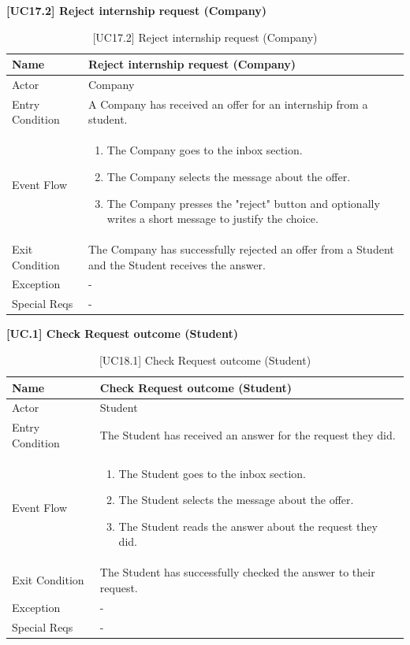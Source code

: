 \textbf{[UC17.2] Reject internship request (Company)}
\begin{table}[H] %
    \centering
    \begin{tabular}{|p{3cm}|p{10cm}|}
    \hline
    Name & Reject internship request (Company) \\ \hline
    Actor  & Company \\ \hline
    Entry Condition  & A Company has received an offer for an internship from a student.  \\ \hline
    Event Flow  & 
    \begin{enumerate}[noitemsep, topsep=0pt]
        \item The Company goes to the inbox section.
        \item The Company selects the message about the offer.
        \item The Company presses the "reject" button and optionally writes a short message to justify the choice.
    \end{enumerate}
    \\ \hline
    Exit Condition  & The Company has successfully rejected an offer from a Student and the Student receives the answer. \\ \hline
    Exception  & - \\ \hline
    Special Reqs  & - \\ \hline
    \end{tabular}
    \caption{[UC17.2] Reject internship request (Company)}
\end{table}
\textbf{[UC\nextUseCases.1] Check Request outcome (Student)}
\begin{table}[H] %
    \centering
    \begin{tabular}{|p{3cm}|p{10cm}|}
    \hline
    Name & Check Request outcome (Student)\\ \hline
    Actor  & Student \\ \hline
    Entry Condition  & The Student has received an answer for the request they did.  \\ \hline
    Event Flow  & 
    \begin{enumerate}[noitemsep, topsep=0pt]
        \item The Student goes to the inbox section.
        \item The Student selects the message about the offer.
        \item The Student reads the answer about the request they did.
    \end{enumerate}
    \\ \hline
    Exit Condition  & The Student has successfully checked the answer to their request. \\ \hline
    Exception  & - \\ \hline
    Special Reqs  & - \\ \hline
    \end{tabular}
    \caption{[UC18.1] Check Request outcome (Student)}
\end{table}
